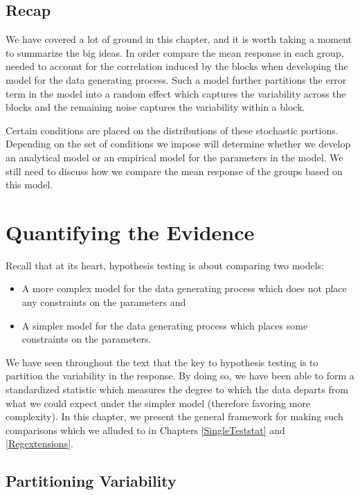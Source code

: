 \documentclass[
]{book}
\providecommand{\tightlist}{%
  \setlength{\itemsep}{0pt}\setlength{\parskip}{0pt}}
\theoremstyle{plain}
\theoremstyle{mydefn}
\theoremstyle{myexmpl}
\theoremstyle{remark}
\begin{document}
\hypertarget{recap-3}{%
\section{Recap}\label{recap-3}}

We have covered a lot of ground in this chapter, and it is worth taking a moment to summarize the big ideas. In order compare the mean response in each group, needed to account for the correlation induced by the blocks when developing the model for the data generating process. Such a model further partitions the error term in the model into a random effect which captures the variability across the blocks and the remaining noise captures the variability within a block.

Certain conditions are placed on the distributions of these stochastic portions. Depending on the set of conditions we impose will determine whether we develop an analytical model or an empirical model for the parameters in the model. We still need to discuss how we compare the mean response of the groups based on this model.

\hypertarget{Blockteststat}{%
\chapter{Quantifying the Evidence}\label{Blockteststat}}

Recall that at its heart, hypothesis testing is about comparing two models:

\begin{itemize}
\tightlist
\item
  A more complex model for the data generating process which does not place any constraints on the parameters and
\item
  A simpler model for the data generating process which places some constraints on the parameters.
\end{itemize}

We have seen throughout the text that the key to hypothesis testing is to partition the variability in the response. By doing so, we have been able to form a standardized statistic which measures the degree to which the data departs from what we could expect under the simpler model (therefore favoring more complexity). In this chapter, we present the general framework for making such comparisons which we alluded to in Chapters \ref{SingleTeststat} and \ref{Regextensions}.

\hypertarget{partitioning-variability-2}{%
\section{Partitioning Variability}\label{partitioning-variability-2}}
\end{document}
